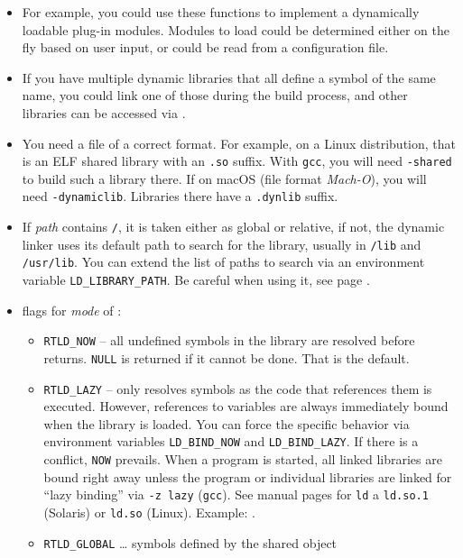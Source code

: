 
\begin{itemize}
\item For example, you could use these functions to implement a dynamically
loadable plug-in modules.  Modules to load could be determined either on the fly
based on user input, or could be read from a configuration file.
\item If you have multiple dynamic libraries that all define a symbol of the
same name, you could link one of those during the build process, and other
libraries can be accessed via .
\item You need a file of a correct format.  For example, on a Linux
distribution, that is an ELF shared library with an \texttt{.so} suffix.  With
\texttt{gcc}, you will need \texttt{-shared} to build such a library there.  If
on macOS (file format \emph{Mach-O}), you will need \texttt{-dynamiclib}.
Libraries there have a \texttt{.dynlib} suffix.
\item If \emph{path} contains \texttt{/}, it is taken either as global or
relative, if not, the dynamic linker uses its default path to search for the
library, usually in \texttt{/lib} and \texttt{/usr/lib}.  You can extend the
list of paths to search via an environment variable \texttt{LD\_LIBRARY\_PATH}.
Be careful when using it, see page \pageref{EVIL_LDLIBPATH}.
\item flags for \emph{mode} of :
    \begin{itemize}
    \item \texttt{RTLD\_NOW} -- all undefined symbols in the library are
    resolved before  returns. \texttt{NULL} is returned if it
    cannot be done. That is the default.
    \item \texttt{RTLD\_LAZY} -- only resolves symbols as the code that
    references them is executed.  However, references to variables are always
    immediately bound when the library is loaded.  You can force the specific
    behavior via environment variables \texttt{LD\_BIND\_NOW} and
    \texttt{LD\_BIND\_LAZY}.  If there is a conflict, \texttt{NOW} prevails.
    When a program is started, all linked libraries are bound right away unless
    the program or individual libraries are linked for ``lazy binding'' via
    \texttt{-z lazy} (\texttt{gcc}).  See manual pages for \texttt{ld} a
    \texttt{ld.so.1} (Solaris) or \texttt{ld.so} (Linux).  Example:
    .
    \item \texttt{RTLD\_GLOBAL} \dots{} symbols defined by the shared object

\end{itemize}
\end{itemize}
